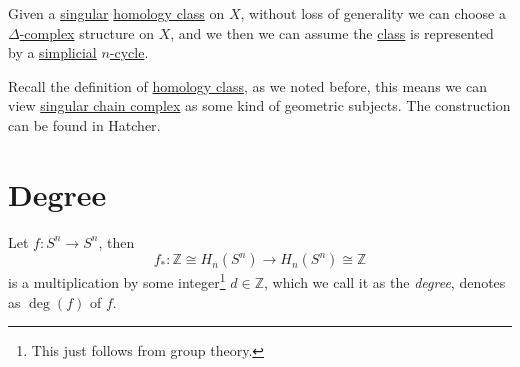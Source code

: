 \begin{corollary}
	Given a \hyperref[def:singular-homology-group]{singular} \hyperref[def:homology-class]{homology class} on \(X\), without loss of generality we can choose a
	\hyperref[def:delta-complex]{\(\Delta \)-complex} structure on \(X\), and we then we can assume the \hyperref[def:homology-class]{class} is represented by a
	\hyperref[def:simplicial-complex]{simplicial} \hyperref[def:cycle]{\(n\)-cycle}.
\end{corollary}
\begin{remark}
	Recall the definition of \hyperref[def:homology-class]{homology class}, as we noted before, this means we can view
	\hyperref[def:singular-chain-complex]{singular chain complex} as some kind of geometric subjects. The construction can be found in Hatcher\cite{hatcher2002algebraic}.
\end{remark}

\section{Degree}
\begin{definition}[Degree]\label{def:degree}
	Let \(f \colon S^n \to S^n\), then
	\[
		f_\ast \colon \mathbb{Z} \cong H_n(S^n) \to H_n(S^n) \cong \mathbb{Z}
	\]
	is a multiplication by some integer\footnote{This just follows from group theory.} \(d \in \mathbb{Z}\),
	which we call it as the \emph{degree}, denotes as \(\deg(f)\) of \(f\).
\end{definition}


